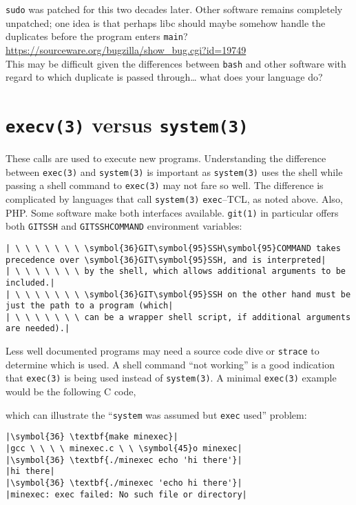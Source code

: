\documentclass[10pt,a4paper]{article}
\begin{document}
\texttt{sudo} was patched for this two decades later. Other software
remains completely unpatched; one idea is that perhaps libc should
maybe somehow handle the duplicates before the program enters
\texttt{main}? \\

\url{https://sourceware.org/bugzilla/show_bug.cgi?id=19749} \\

This may be difficult given the differences between \texttt{bash} and
other software with regard to which duplicate is passed through\ldots
what does your language do?

\section*{\texttt{execv(3)} versus \texttt{system(3)}}

These calls are used to execute new programs. Understanding the
difference between \texttt{exec(3)} and \texttt{system(3)} is important
as \texttt{system(3)} uses the shell while passing a shell command to
\texttt{exec(3)} may not fare so well. The difference is complicated by
languages that call \texttt{system(3)} \texttt{exec}--TCL, as noted
above. Also, PHP. Some software make both interfaces available.
\texttt{git(1)} in particular offers both \texttt{GITSSH} and
\texttt{GITSSHCOMMAND} environment variables:

\begin{lstlisting}
| \ \ \ \ \ \ \ \symbol{36}GIT\symbol{95}SSH\symbol{95}COMMAND takes precedence over \symbol{36}GIT\symbol{95}SSH, and is interpreted|
| \ \ \ \ \ \ \ by the shell, which allows additional arguments to be included.|
| \ \ \ \ \ \ \ \symbol{36}GIT\symbol{95}SSH on the other hand must be just the path to a program (which|
| \ \ \ \ \ \ \ can be a wrapper shell script, if additional arguments are needed).|
\end{lstlisting}

Less well documented programs may need a source code dive or
\texttt{strace} to determine which is used. A shell command ``not
working'' is a good indication that \texttt{exec(3)} is being used
instead of \texttt{system(3)}. A minimal \texttt{exec(3)} example would
be the following C code,



which can illustrate the ``\texttt{system} was assumed but \texttt{exec}
used'' problem:

\begin{lstlisting}
|\symbol{36} \textbf{make minexec}|
|gcc \ \ \ \ minexec.c \ \ \symbol{45}o minexec|
|\symbol{36} \textbf{./minexec echo 'hi there'}|
|hi there|
|\symbol{36} \textbf{./minexec 'echo hi there'}|
|minexec: exec failed: No such file or directory|
\end{lstlisting}
\end{document}
